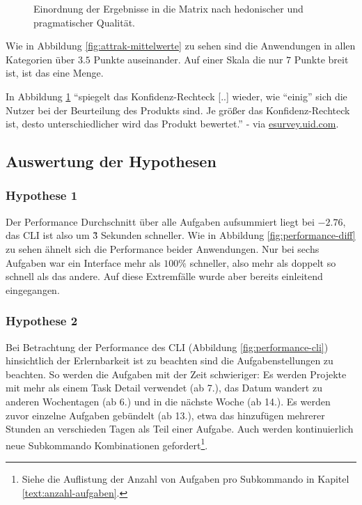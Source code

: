 \documentclass[oneside,bibliography=totocnumbered,BCOR=5mm]{scrbook}
\begin{document}
\begin{figure}[H]
\begin{minipage}[b]{0.4\textwidth}
    \caption{Einordnung der Ergebnisse in die Matrix nach hedonischer und pragmatischer Qualität.}
    \label{fig:attrak-portfolio}
  \end{minipage}
\end{figure}

Wie in Abbildung \ref{fig:attrak-mittelwerte} zu sehen sind die Anwendungen in
allen Kategorien über $3.5$ Punkte auseinander. Auf einer Skala die nur $7$
Punkte breit ist, ist das eine Menge.

In Abbildung \ref{fig:attrak-portfolio} ``spiegelt das Konfidenz-Rechteck
[..] wieder, wie ``einig'' sich die Nutzer bei der Beurteilung
des Produkts sind. Je größer das Konfidenz-Rechteck ist, desto
unterschiedlicher wird das Produkt bewertet.'' - \textcite{attrakdiff} via
\href{https://esurvey.uid.com/}{esurvey.uid.com}.

\subsection{Auswertung der Hypothesen}

\subsubsection{Hypothese 1}

Der Performance Durchschnitt über alle Aufgaben aufsummiert liegt bei
$-2.76$, das CLI ist also um \~3 Sekunden schneller. Wie in Abbildung
\ref{fig:performance-diff} zu sehen ähnelt sich die Performance beider
Anwendungen. Nur bei sechs Aufgaben war ein Interface mehr als $100\%$
schneller, also mehr als doppelt so schnell als das andere. Auf diese
Extremfälle wurde aber bereits einleitend eingegangen.

\subsubsection{Hypothese 2}

Bei Betrachtung der Performance des CLI (Abbildung \ref{fig:performance-cli})
hinsichtlich der Erlernbarkeit ist zu beachten sind die Aufgabenstellungen zu
beachten. So werden die Aufgaben mit der Zeit schwieriger: Es werden Projekte
mit mehr als einem Task Detail verwendet (ab 7.), das Datum wandert zu anderen
Wochentagen (ab 6.) und in die nächste Woche (ab 14.). Es werden zuvor einzelne
Aufgaben gebündelt (ab 13.), etwa das hinzufügen mehrerer Stunden an verschieden
Tagen als Teil einer Aufgabe. Auch werden kontinuierlich neue Subkommando
Kombinationen gefordert\footnote{Siehe die Auflistung der Anzahl von Aufgaben
pro Subkommando in Kapitel \ref{text:anzahl-aufgaben}.}.
\end{document}
